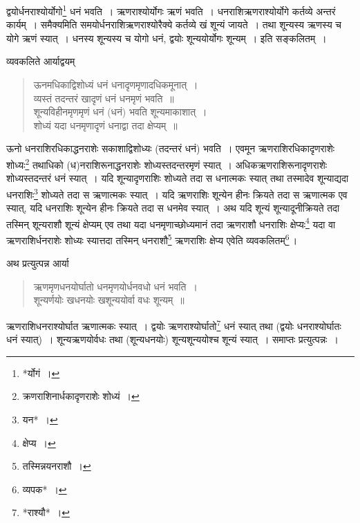 \documentclass[10pt, openany]{book}
\begin{document}
{{{{{{{द्वयोर्धनराश्योर्योगो\renewcommand{\thefootnote}{१३}\footnote{*र्योगं~।} धनं भवति~। ऋणराश्योर्योगः ऋणं भवति~। 
धनराशिऋणराश्योर्योगे कर्तव्ये अन्तरं कार्यम्~। {समैक्यमिति}
समयोर्धनराशिऋणराश्योरैक्ये कर्तव्ये {खं}
{शून्यं जायते~। तथा शून्यस्य ऋणस्य च योगे ऋणं स्यात्~। धनस्य शून्यस्य च
योगो}
{धनं, द्वयोः शून्ययोर्योगः शून्यम्~। इति सङ्कलितम्~।} 

\newpage

{व्यवकलिते आर्याद्वयम्\textendash}

\begin{quote}
    
{\qt ऊनमधिकाद्विशोध्यं धनं धनादृणमृणादधिकमूनात्~।\\
 व्यस्तं तदन्तरं खादृणं धनं धनमृणं भवति~॥ \\
 शून्यविहीनमृणमृणं धनं (धनं) भवति शून्यमाकाशात्~।\\
 शोध्यं यदा धनमृणादृणं धनाद्वा तदा क्षेप्यम्~॥}\end{quote}

 {ऊनो धनराशिरधिकाद्धनराशेः सकाशाद्विशोध्यः (तदन्तरं धनं) भवति~। एवमून}
{ऋणराशिरधिकादृणराशेः शोध्यः\renewcommand{\thefootnote}{१}\footnote{क्रणराशिनार्धकादृणराशेः शोध्यं~।} तथाधिको (ध)नराशिरूनाद्धनराशेः
शोध्यस्तदन्तरमृणं}
{स्यात्~। अधिकऋणराशिरूनादृणराशेः शोध्यस्तदन्तरं धनं स्यात्~। यदि
शून्यादृणराशिः शोध्यते}
{तदा स धनात्मकः स्यात् तथा तस्मादेव शून्याद्यदा धनराशिः\renewcommand{\thefootnote}{२}\footnote{यन*~।} शोध्यते तदा
स ऋणात्मकः}
{स्यात्~। यदि ऋणराशिः शून्येन हीनः क्रियते तदा स ऋणात्मक एव स्यात्, यदि
धनराशिः शून्येन}
{हीनः क्रियते तदा स धनमेव स्यात्~। अथ यदि शून्यं शून्यादूनीक्रियते तदा
तस्मिन् शून्यराशौ शून्यं क्षेप्यम् एव तथा यदा धनमृणाच्छोध्यमानं तदा ऋणराशौ धनराशिः
क्षेप्यः\renewcommand{\thefootnote}{३}\footnote{क्षेप्य~।}  यदा वा ऋणराशिर्धनराशेः शोध्यः स्यात्तदा तस्मिन् धनराशौ\renewcommand{\thefootnote}{४}\footnote{तस्मिन्नयनराशौ~।}  ऋणराशिः क्षेप्य
एवेति व्यवकलितम्\renewcommand{\thefootnote}{५}\footnote{व्यपक*~।}\,।}
\vspace{3mm}

{अथ प्रत्युत्पन्न आर्या\textendash}

\begin{quote}
    
{\qt ऋणमृणधनयोर्घातो धनमृणयोर्धनवधो धनं भवति~।\\
 शून्यर्णयोः खधनयोः खशून्ययोर्वा वधः शून्यम्~॥}\end{quote}

{ऋणराशिधनराश्योर्घात ऋणात्मकः स्यात्~। द्वयोः ऋणराश्योर्घातो\renewcommand{\thefootnote}{६}\footnote{*राश्यौ*~।}  धनं
स्यात् तथा}
{(द्वयोः धनराश्योर्घातः धनं स्यात्)~। शून्यऋणयोर्वधः तथा (शून्यधनयोः)
शून्यशून्ययोश्च शून्यं स्यात्~। समाप्तः प्रत्युत्पन्नः~।}
\vspace{3mm}

}}}}}}}
\end{document}

